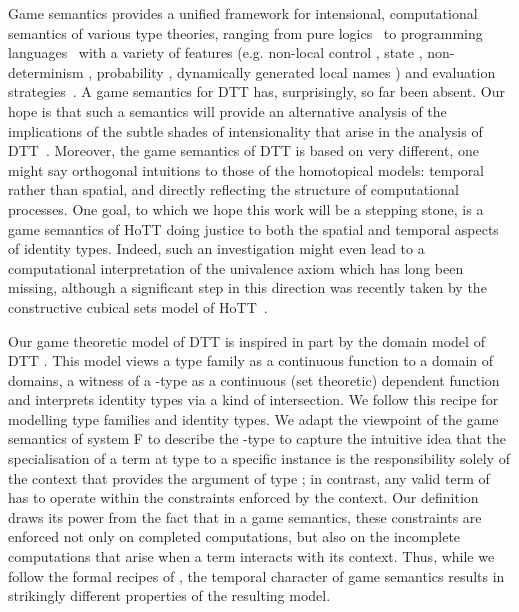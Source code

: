\documentclass[runningheads,a4paper]{llncs}
\begin{document}
Game semantics provides a unified framework for intensional, computational semantics of various type theories, ranging from pure logics~\cite{abramsky1994gamesll} to programming languages~\cite{hyland2000full,abramsky2000full,abramsky2005game} with a variety of features (e.g. non-local control \cite{laird1997full}, state \cite{abramsky1996linearity,abramsky1998fully,murawski2011game}, non-determinism \cite{harmer1999fully}, probability \cite{danos2002probabilistic}, dynamically generated local names \cite{abramsky2004nominal}) and evaluation strategies~\cite{abramsky1998cbvgames}. A game semantics for \textsf{DTT}  has,  surprisingly, so far been  absent.   
Our hope is that such a  semantics  will provide an alternative analysis of the implications of the subtle shades of intensionality that arise in the analysis of \textsf{DTT}~\cite{streicher1993investigations,hofmann1997syntax}. 
Moreover, the game semantics of \textsf{DTT} is based on very different, one might say orthogonal intuitions to those of the homotopical models: temporal  rather than spatial, and directly reflecting the structure of computational processes. One goal, to which we hope this work  will be a stepping stone, is a game semantics of \textsf{HoTT} doing justice to both the spatial and temporal aspects of identity types. Indeed, such an investigation might even lead to a computational interpretation of the univalence axiom which has long been missing, although a significant step in this direction was recently taken by the constructive cubical sets model of \textsf{HoTT}~\cite{bezem2014model}.  

Our game theoretic model of \textsf{DTT} is inspired in part by the domain model of \textsf{DTT} \cite{palmgren1990domain}.  This model views a type family as a continuous function to a domain of domains, a witness of a -type  as a continuous (set theoretic) dependent function and interprets identity types via a kind of  intersection.    We follow this recipe for modelling type families  and identity types.   We adapt the viewpoint of  the game semantics of system F \cite{abramsky2005game}
to describe the -type to capture the intuitive idea that the specialisation of a term at type  to a specific instance   is the responsibility solely of the context that provides the argument  of type ; in contrast, any valid term of  has to operate within the constraints enforced by the context.  Our definition draws its power from the fact that in a game semantics, these constraints are enforced not only on completed computations, but also on the incomplete computations that arise when a term interacts with its context.    Thus, while we follow the formal recipes of \cite{palmgren1990domain}, the temporal character of game semantics results in strikingly different properties of the resulting model.
\end{document}
